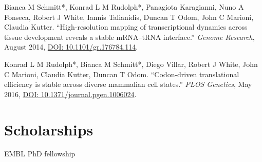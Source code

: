 \documentclass{klmr-cv}
\begin{document}

\begin{enumerate}
    \listitem Bianca M Schmitt*, Konrad L M Rudolph*, Panagiota Karagianni,
        Nuno A Fonseca, Robert J White, Iannis Talianidis, Duncan T Odom,
        John C Marioni, Claudia Kutter. “High-resolution mapping of
        transcriptional dynamics across tissue development reveals a stable
        mRNA--tRNA interface.” \textit{Genome Research}, August 2014,
        \href{http://dx.doi.org/10.1101/gr.176784.114}{DOI:
        10.1101/gr.176784.114}.

    \listitem Konrad L M Rudolph*, Bianca M Schmitt*, Diego Villar, Robert J
        White, John C Marioni, Claudia Kutter, Duncan T Odom. “Codon-driven
        translational efficiency is stable across diverse mammalian cell
        states.” \textit{PLOS Genetics}, May 2016,
        \href{http://dx.doi.org/10.1371/journal.pgen.1006024}{DOI:
        10.1371/journal.pgen.1006024}.
\end{enumerate}

\section{Scholarships}

\item{EMBL PhD fellowship}
\end{document}
